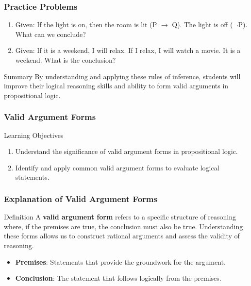 \documentclass[aspectratio=169]{beamer}
\begin{document}
\begin{frame}[fragile]
    \frametitle{Practice Problems}
    \begin{enumerate}
        \item Given: If the light is on, then the room is lit (P $\rightarrow$ Q). The light is off (¬P). What can we conclude?
        \item Given: If it is a weekend, I will relax. If I relax, I will watch a movie. It is a weekend. What is the conclusion?
    \end{enumerate}

    \begin{block}{Summary}
        By understanding and applying these rules of inference, students will improve their logical reasoning skills and ability to form valid arguments in propositional logic.
    \end{block}
\end{frame}

\begin{frame}[fragile]
    \frametitle{Valid Argument Forms}
    \begin{block}{Learning Objectives}
        \begin{enumerate}
            \item Understand the significance of valid argument forms in propositional logic.
            \item Identify and apply common valid argument forms to evaluate logical statements.
        \end{enumerate}
    \end{block}
\end{frame}

\begin{frame}[fragile]
    \frametitle{Explanation of Valid Argument Forms}
    \begin{block}{Definition}
        A \textbf{valid argument form} refers to a specific structure of reasoning where, if the premises are true, the conclusion must also be true. Understanding these forms allows us to construct rational arguments and assess the validity of reasoning.
    \end{block}
    
    \begin{itemize}
        \item \textbf{Premises}: Statements that provide the groundwork for the argument.
        \item \textbf{Conclusion}: The statement that follows logically from the premises.
    \end{itemize}
\end{frame}
\end{document}
